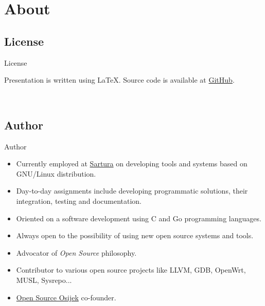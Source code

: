 \section*{About}

\subsection*{License}
\begin{frame}{License}
    \begin{center}
        Presentation is written using \LaTeX. Source code is available at \href{https://github.com/hvarga/openwrt-application-development}{GitHub}.
    \end{center}
    \vfill
    \begin{center}
        \doclicenseImage
        \\
        \doclicenseLongText
    \end{center}
\end{frame}


\subsection*{Author}
\begin{frame}{Author}
    \pause
    \begin{itemize}[<+-|alert@+>]
        \item Currently employed at \href{http://www.sartura.hr/}{Sartura} on developing tools and systems based on GNU/Linux distribution.
        \item Day-to-day assignments include developing programmatic solutions, their integration, testing and documentation.
        \item Oriented on a software development using C and Go programming languages.
        \item Always open to the possibility of using new open source systems and tools.
        \item Advocator of \textit{Open Source} philosophy.
        \item Contributor to various open source projects like LLVM, GDB, OpenWrt, MUSL, Sysrepo...
        \item \href{https://www.opensource-osijek.org}{Open Source Osijek} co-founder.
    \end{itemize}
\end{frame}

